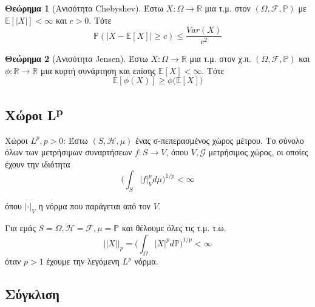 \documentclass[12pt,a4paper]{article}
\theoremstyle{definition}
\numberwithin{equation}{section}
\newtheorem{theorima}{Θεώρημα}
\begin{document}
{\begin{theorima}[Ανισότητα Chebyshev]
Έστω $X:\Omega \rightarrow \mathbb{R}$ μια τ.μ. στον $(\Omega, \mathcal{F}, \mathbb{P})$ με $\mathbb{E}[|X|]<\infty$ και $c>0$. Τότε
$$\mathbb{P}(|X-\mathbb{E}[X]|\geq c) \leq \frac{Var(X)}{c^2} $$
\end{theorima}

\begin{theorima}[Ανισότητα Jensen]
Έστω $X:\Omega \rightarrow \mathbb{R}$ μια τ.μ. στον χ.π. $(\Omega,\mathcal{F},\mathbb{P})$ και $\phi:\mathbb{R} \rightarrow \mathbb{R}$ μια κυρτή συνάρτηση και επίσης $\mathbb{E}[X] <\infty$. Τότε
$$\mathbb{E}[\phi(X)] \geq \phi \big( \mathbb{E}[X]\big)$$
\end{theorima}

\subsection{Χώροι L\textsuperscript{p}}
\label{sec:org6e3fc32}

Χώροι \(L^p, p>0\): Έστω \((S,\mathcal{H},\mu)\) ένας σ-πεπερασμένος χώρος μέτρου. Το σύνολο όλων των μετρήσιμων συναρτήσεων \(f:S \rightarrow V\), όπου \(V,\mathcal{G}\) μετρήσιμος χώρος, οι οποίες έχουν την ιδιότητα
$$ \Big( \int_S |f|_V ^p d\mu \Big)^{1/p}  <\infty $$

όπου \(|\cdot|_V\) η νόρμα που παράγεται από τον \(V\).

Για εμάς \(S=\Omega, \mathcal{H}=\mathcal{F}, \mu = \mathbb{P}\) και θέλουμε όλες τις τ.μ. τ.ω.
$$||X||_p = \Big( \int_\Omega |X|^p d\mathbb{P} \Big)^{1/p} < \infty $$
όταν \(p>1\) έχουμε την λεγόμενη \(L^p\) νόρμα.

\subsection{Σύγκλιση}
\label{sec:org33eb8a5}

}
\end{document}
